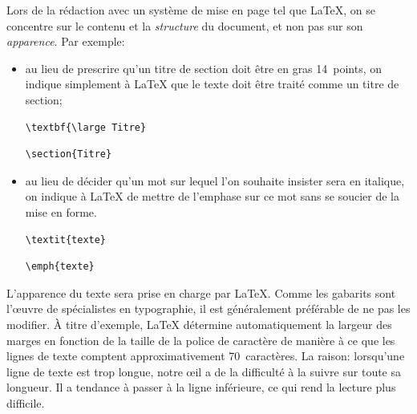 Lors de la rédaction avec un système de mise en page tel que {\LaTeX},
on se concentre sur le contenu et la \emph{structure} du document, et
non pas sur son \emph{apparence}. Par exemple:
\begin{itemize}
\item au lieu de prescrire qu'un titre de section doit être en gras
  14~points, on indique simplement à {\LaTeX} que le texte doit être
  traité comme un titre de section;
  \begin{demo}
    \begin{minipage}{0.45\linewidth}
\begin{lstlisting}
\textbf{\large Titre}
\end{lstlisting}
    \end{minipage}
    \hfill \faArrowRight \hfill
    \begin{minipage}{0.45\linewidth}
\begin{lstlisting}
\section{Titre}
\end{lstlisting}
    \end{minipage}
  \end{demo}
\item au lieu de décider qu'un mot sur lequel l'on souhaite insister
  sera en italique, on indique à {\LaTeX} de mettre de l'emphase sur
  ce mot sans se soucier de la mise en forme.
  \begin{demo}
    \begin{minipage}{0.45\linewidth}
\begin{lstlisting}
\textit{texte}
\end{lstlisting}
    \end{minipage}
    \hfill \faArrowRight \hfill
    \begin{minipage}{0.45\linewidth}
\begin{lstlisting}
\emph{texte}
\end{lstlisting}
    \end{minipage}
  \end{demo}
\end{itemize}

L'apparence du texte sera prise en charge par {\LaTeX}. Comme les
gabarits sont l'{\oe}uvre de spécialistes en typographie, il est
généralement préférable de ne pas les modifier. À titre d'exemple,
{\LaTeX} détermine automatiquement la largeur des marges en fonction
de la taille de la police de caractère de manière à ce que les lignes
de texte comptent approximativement 70~caractères. La raison:
lorsqu'une ligne de texte est trop longue, notre {\oe}il a de la
difficulté à la suivre sur toute sa longueur. Il a tendance à passer à
la ligne inférieure, ce qui rend la lecture plus difficile.

